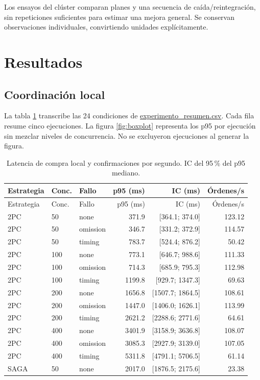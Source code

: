 \documentclass[12pt,a4paper]{article}
\newcommand{\evidencia}[2]{\href{https://github.com/JoseLozanoMorales/TiendaTech/blob/c5dca588ea9662cab56732c97fe644b9a929854b/#1}{#2}}
\newcommand{\seccion}[1]{\section{#1}}
\begin{document}
Los ensayos del clúster comparan planes y una secuencia de caída/reintegración, sin repeticiones suficientes para estimar una mejora general. Se conservan observaciones individuales, convirtiendo unidades explícitamente.

\seccion{Resultados}
\subsection{Coordinación local}
La tabla \ref{tab:coordinacion} transcribe las 24 condiciones de \evidencia{experiments/paso8/resultados/experimento_resumen.csv}{experimento\_resumen.csv}. Cada fila resume cinco ejecuciones. La figura \ref{fig:boxplot} representa los p95 por ejecución sin mezclar niveles de concurrencia. No se excluyeron ejecuciones al generar la figura.

{\small
\begin{longtable}{lllrrr}
\caption{Latencia de compra local y confirmaciones por segundo. IC del 95\,\% del p95 mediano.}\label{tab:coordinacion}\\
\toprule Estrategia & Conc. & Fallo & p95 (ms) & IC (ms) & Órdenes/s\\\midrule\endfirsthead
\toprule Estrategia & Conc. & Fallo & p95 (ms) & IC (ms) & Órdenes/s\\\midrule\endhead
2PC & 50 & none & 371.9 & [364.1; 374.0] & 123.12 \\
2PC & 50 & omission & 346.7 & [331.2; 372.9] & 114.57 \\
2PC & 50 & timing & 783.7 & [524.4; 876.2] & 50.42 \\
2PC & 100 & none & 773.1 & [646.7; 988.6] & 111.33 \\
2PC & 100 & omission & 714.3 & [685.9; 795.3] & 112.98 \\
2PC & 100 & timing & 1199.8 & [929.7; 1347.3] & 69.63 \\
2PC & 200 & none & 1656.8 & [1507.7; 1864.5] & 108.61 \\
2PC & 200 & omission & 1447.0 & [1406.0; 1626.1] & 113.99 \\
2PC & 200 & timing & 2621.2 & [2288.6; 2771.6] & 64.61 \\
2PC & 400 & none & 3401.9 & [3158.9; 3636.8] & 108.07 \\
2PC & 400 & omission & 3085.3 & [2927.9; 3139.0] & 107.05 \\
2PC & 400 & timing & 5311.8 & [4791.1; 5706.5] & 61.14 \\
SAGA & 50 & none & 2017.0 & [1876.5; 2175.6] & 23.38 \\

\end{longtable}}
\end{document}
